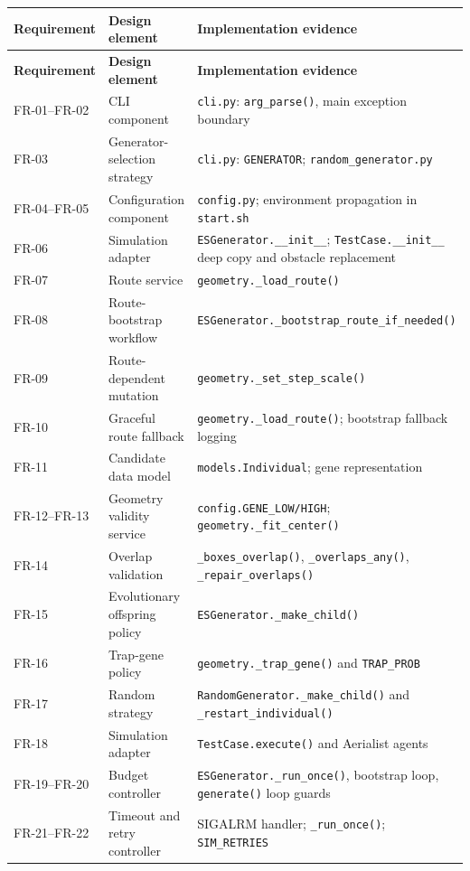 \documentclass[11pt,a4paper]{report}
\newcommand{\code}[1]{\texttt{#1}}
\begin{document}
\small
\begin{longtable}{L{2.3cm} L{4.2cm} L{7.7cm}}
\toprule
\textbf{Requirement} & \textbf{Design element} & \textbf{Implementation evidence}\\
\midrule
\endfirsthead
\toprule
\textbf{Requirement} & \textbf{Design element} & \textbf{Implementation evidence}\\
\midrule
\endhead
FR-01--FR-02 & CLI component & \code{cli.py}: \code{arg\_parse()}, main exception boundary\\
FR-03 & Generator-selection strategy & \code{cli.py}: \code{GENERATOR}; \code{random\_generator.py}\\
FR-04--FR-05 & Configuration component & \code{config.py}; environment propagation in \code{start.sh}\\
FR-06 & Simulation adapter & \code{ESGenerator.\_\_init\_\_}; \code{TestCase.\_\_init\_\_} deep copy and obstacle replacement\\
FR-07 & Route service & \code{geometry.\_load\_route()}\\
FR-08 & Route-bootstrap workflow & \code{ESGenerator.\_bootstrap\_route\_if\_needed()}\\
FR-09 & Route-dependent mutation & \code{geometry.\_set\_step\_scale()}\\
FR-10 & Graceful route fallback & \code{geometry.\_load\_route()}; bootstrap fallback logging\\
FR-11 & Candidate data model & \code{models.Individual}; gene representation\\
FR-12--FR-13 & Geometry validity service & \code{config.GENE\_LOW/HIGH}; \code{geometry.\_fit\_center()}\\
FR-14 & Overlap validation & \code{\_boxes\_overlap()}, \code{\_overlaps\_any()}, \code{\_repair\_overlaps()}\\
FR-15 & Evolutionary offspring policy & \code{ESGenerator.\_make\_child()}\\
FR-16 & Trap-gene policy & \code{geometry.\_trap\_gene()} and \code{TRAP\_PROB}\\
FR-17 & Random strategy & \code{RandomGenerator.\_make\_child()} and \code{\_restart\_individual()}\\
FR-18 & Simulation adapter & \code{TestCase.execute()} and Aerialist agents\\
FR-19--FR-20 & Budget controller & \code{ESGenerator.\_run\_once()}, bootstrap loop, \code{generate()} loop guards\\
FR-21--FR-22 & Timeout and retry controller & SIGALRM handler; \code{\_run\_once()}; \code{SIM\_RETRIES}\\

\end{longtable}
\end{document}
